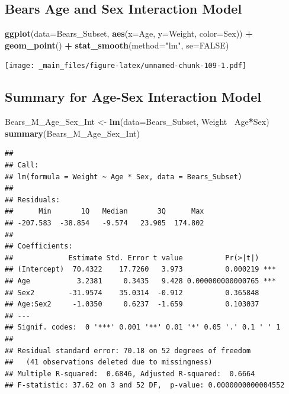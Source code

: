 \documentclass[]{book}
\newenvironment{Shaded}{\begin{snugshade}}{\end{snugshade}}
\newcommand{\KeywordTok}[1]{\textcolor[rgb]{0.13,0.29,0.53}{\textbf{#1}}}
\newcommand{\DataTypeTok}[1]{\textcolor[rgb]{0.13,0.29,0.53}{#1}}
\newcommand{\StringTok}[1]{\textcolor[rgb]{0.31,0.60,0.02}{#1}}
\newcommand{\OtherTok}[1]{\textcolor[rgb]{0.56,0.35,0.01}{#1}}
\newcommand{\OperatorTok}[1]{\textcolor[rgb]{0.81,0.36,0.00}{\textbf{#1}}}
\newcommand{\NormalTok}[1]{#1}
\begin{document}
\subsection{Bears Age and Sex Interaction
Model}\label{bears-age-and-sex-interaction-model}

\begin{Shaded}
\begin{Highlighting}[]
\KeywordTok{ggplot}\NormalTok{(}\DataTypeTok{data=}\NormalTok{Bears_Subset, }\KeywordTok{aes}\NormalTok{(}\DataTypeTok{x=}\NormalTok{Age, }\DataTypeTok{y=}\NormalTok{Weight, }\DataTypeTok{color=}\NormalTok{Sex)) }\OperatorTok{+}\StringTok{ }
\StringTok{  }\KeywordTok{geom_point}\NormalTok{() }\OperatorTok{+}\StringTok{ }\KeywordTok{stat_smooth}\NormalTok{(}\DataTypeTok{method=}\StringTok{"lm"}\NormalTok{, }\DataTypeTok{se=}\OtherTok{FALSE}\NormalTok{)}
\end{Highlighting}
\end{Shaded}

\texttt{[image: \_main\_files/figure-latex/unnamed-chunk-109-1.pdf]}

\subsection{Summary for Age-Sex Interaction
Model}\label{summary-for-age-sex-interaction-model}

\begin{Shaded}
\begin{Highlighting}[]
\NormalTok{Bears_M_Age_Sex_Int <-}\StringTok{ }\KeywordTok{lm}\NormalTok{(}\DataTypeTok{data=}\NormalTok{Bears_Subset, Weight}\OperatorTok{~}\StringTok{ }\NormalTok{Age}\OperatorTok{*}\NormalTok{Sex)}
\KeywordTok{summary}\NormalTok{(Bears_M_Age_Sex_Int)}
\end{Highlighting}
\end{Shaded}

\begin{verbatim}
## 
## Call:
## lm(formula = Weight ~ Age * Sex, data = Bears_Subset)
## 
## Residuals:
##      Min       1Q   Median       3Q      Max 
## -207.583  -38.854   -9.574   23.905  174.802 
## 
## Coefficients:
##             Estimate Std. Error t value          Pr(>|t|)    
## (Intercept)  70.4322    17.7260   3.973          0.000219 ***
## Age           3.2381     0.3435   9.428 0.000000000000765 ***
## Sex2        -31.9574    35.0314  -0.912          0.365848    
## Age:Sex2     -1.0350     0.6237  -1.659          0.103037    
## ---
## Signif. codes:  0 '***' 0.001 '**' 0.01 '*' 0.05 '.' 0.1 ' ' 1
## 
## Residual standard error: 70.18 on 52 degrees of freedom
##   (41 observations deleted due to missingness)
## Multiple R-squared:  0.6846, Adjusted R-squared:  0.6664 
## F-statistic: 37.62 on 3 and 52 DF,  p-value: 0.0000000000004552
\end{verbatim}
\end{document}
